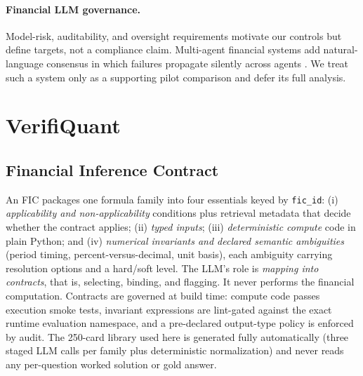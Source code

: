 \documentclass[sigconf,anonymous]{acmart}
\begin{document}
\paragraph{Financial LLM governance.}
Model-risk, auditability, and oversight requirements \cite{fed2011sr117,euaiact2024,finra2020ai} motivate our controls but define targets, not a compliance claim.
Multi-agent financial systems \cite{kundu2025multiagent} add natural-language consensus in which failures propagate silently across agents \cite{cemri2025mas}. We treat such a system only as a supporting pilot comparison and defer its full analysis.

\section{VerifiQuant}\label{sec:v2method}
\subsection{Financial Inference Contract}
An FIC packages one formula family into four essentials keyed by \texttt{fic\_id}: (i) \emph{applicability and non-applicability} conditions plus retrieval metadata that decide whether the contract applies; (ii) \emph{typed inputs}; (iii) \emph{deterministic compute} code in plain Python; and (iv) \emph{numerical invariants and declared semantic ambiguities} (period timing, percent-versus-decimal, unit basis), each ambiguity carrying resolution options and a hard/soft level.
The LLM's role is \emph{mapping into contracts}, that is, selecting, binding, and flagging. It never performs the financial computation.
Contracts are governed at build time: compute code passes execution smoke tests, invariant expressions are lint-gated against the exact runtime evaluation namespace, and a pre-declared output-type policy is enforced by audit.
The 250-card library used here is generated fully automatically (three staged LLM calls per family plus deterministic normalization) and never reads any per-question worked solution or gold answer.
\end{document}

